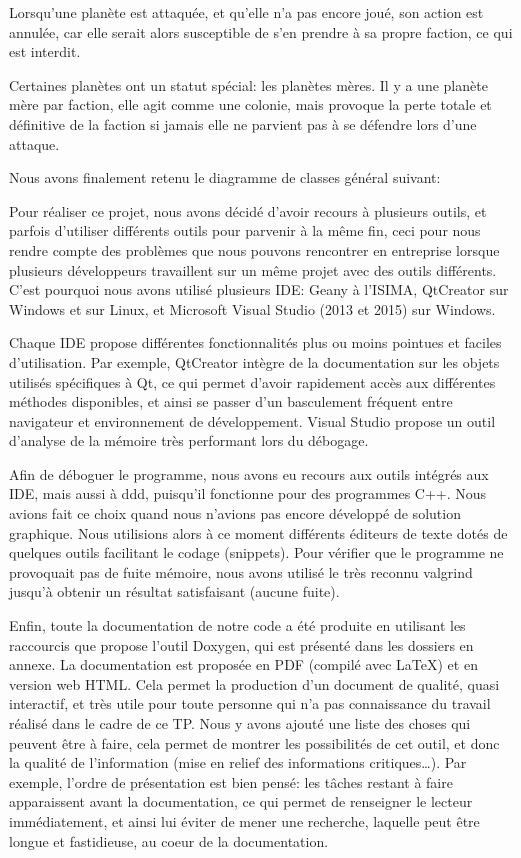 Lorsqu’une planète est attaquée, et qu’elle n’a pas encore joué, son action est annulée, car elle serait alors susceptible de s’en prendre à sa propre faction, ce qui est interdit.

Certaines planètes ont un statut spécial: les planètes mères. Il y a une planète mère par faction, elle agit comme une colonie, mais provoque la perte totale et définitive de la faction si jamais elle ne parvient pas à se défendre lors d’une attaque.

\newpage
Nous avons finalement retenu le diagramme de classes général suivant:
\begin{figure*}[h!]
	\centering
	
\end{figure*}

Pour réaliser ce projet, nous avons décidé d’avoir recours à plusieurs outils, et parfois d’utiliser différents outils pour parvenir à la même fin, ceci pour nous rendre compte des problèmes que nous pouvons rencontrer en entreprise lorsque plusieurs développeurs travaillent sur un même projet avec des outils différents. C’est pourquoi nous avons utilisé plusieurs IDE: Geany à l’ISIMA, QtCreator sur Windows et sur Linux, et Microsoft Visual Studio (2013 et 2015) sur Windows.

Chaque IDE propose différentes fonctionnalités plus ou moins pointues et faciles d’utilisation. Par exemple, QtCreator intègre de la documentation sur les objets utilisés spécifiques à Qt, ce qui permet d’avoir rapidement accès aux différentes méthodes disponibles, et ainsi se passer d’un basculement fréquent entre navigateur et environnement de développement. Visual Studio propose un outil d’analyse de la mémoire très performant lors du débogage.

Afin de déboguer le programme, nous avons eu recours aux outils intégrés aux IDE, mais aussi à ddd, puisqu’il fonctionne pour des programmes C++. Nous avions fait ce choix quand nous n’avions pas encore développé de solution graphique. Nous utilisions alors à ce moment différents éditeurs de texte dotés de quelques outils facilitant le codage (snippets). Pour vérifier que le programme ne provoquait pas de fuite mémoire, nous avons utilisé le très reconnu valgrind jusqu’à obtenir un résultat satisfaisant (aucune fuite).

Enfin, toute la documentation de notre code a été produite en utilisant les raccourcis que propose l’outil Doxygen, qui est présenté dans les dossiers en annexe. La documentation est proposée en PDF (compilé avec LaTeX) et en version web HTML. Cela permet la production d’un document de qualité, quasi interactif, et très utile pour toute personne qui n’a pas connaissance du travail réalisé dans le cadre de ce TP. Nous y avons ajouté une liste des choses qui peuvent être à faire, cela permet de montrer les possibilités de cet outil, et donc la qualité de l’information (mise en relief des informations critiques…). Par exemple, l’ordre de présentation est bien pensé: les tâches restant à faire apparaissent avant la documentation, ce qui permet de renseigner le lecteur immédiatement, et ainsi lui éviter de mener une recherche, laquelle peut être longue et fastidieuse, au coeur de la documentation.

